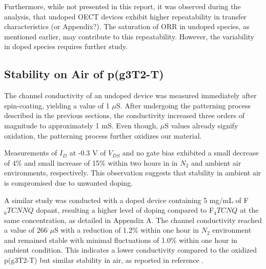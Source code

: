 Furthermore, while not presented in this report, it was observed during the analysis, that undoped OECT devices exhibit higher repeatability in transfer characteristics (or Appendix?). The saturation of ORR in undoped species, as mentioned earlier, may contribute to this repeatability. However, the variability in doped species requires further study. %

\subsection{Stability on Air of p(g3T2-T)}
The channel conductivity of an undoped device was measured immediately after spin-coating, yielding a value of 1 $\mu$S. After undergoing the patterning process described in the previous sections, the conductivity increased three orders of magnitude to approximately 1 mS. Even though, $\mu$S values already signify oxidation, the patterning process further oxidizes our material. %

Measurements of $I_{D}$ at -0.3 V of $V_{DS}$ and no gate bias exhibited a small decrease of 4\% and small increase of 15\% within two hours in in $N_{2}$ and ambient air environments, respectively. This observation suggests that stability in ambient air is compromised due to unwanted doping.

A similar study was conducted with a doped device containing 5 mg/mL of F$_{6}TCNNQ$ dopant, resulting a higher level of doping compared to F$_{4}TCNQ$ at the same concentration, as detailed in Appendix A. The channel conductivity reached a value of 266 $\mu$S with a reduction of 1.2\% within one hour in $N_{2}$ environment and remained stable with minimal fluctuations of 1.0\% within one hour in ambient condition. This indicates a lower conductivity compared to the oxidized p(g3T2-T) but similar stability in air, as reported in reference \cite{tanTuningOrganicElectrochemical2022}.

